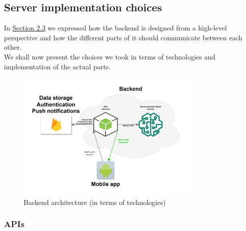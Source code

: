 \documentclass[../../main]{subfiles}
\begin{document}
\subsection{Server implementation choices}
\label{ss:server-implementation-choices}

In \hyperref[ss:backend-architecture]{Section 2.3} we expressed how the backend is designed from a high-level perspective and how the different parts of it should communicate between each other.\\
We shall now present the choices we took in terms of technologies and implementation of the actual parts.

\begin{figure}[h]
    \centering
    \includegraphics[width=0.8\textwidth]{images/backend_architecture_technologies}
    \caption{Backend architecture (in terms of technologies)}\label{fig:backend_architecture_technologies}
\end{figure}

\subsubsection{APIs}
\label{sss:apis-development}
\end{document}
